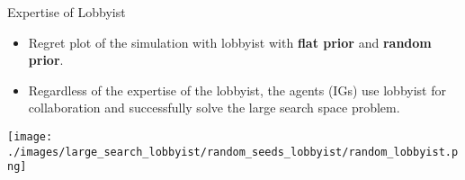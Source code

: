 \documentclass{beamer}
\begin{document}
	\begin{frame}{Expertise of Lobbyist}
		\begin{itemize}
			\item Regret plot of the simulation with lobbyist with \textbf{flat prior} and \textbf{random prior}.
			\item Regardless of the expertise of the lobbyist, the agents (IGs) use lobbyist for collaboration and successfully solve the large search space problem.
		\end{itemize}
		\centering	\texttt{[image: ./images/large\_search\_lobbyist/random\_seeds\_lobbyist/random\_lobbyist.png]}
	\end{frame}


\end{document}
